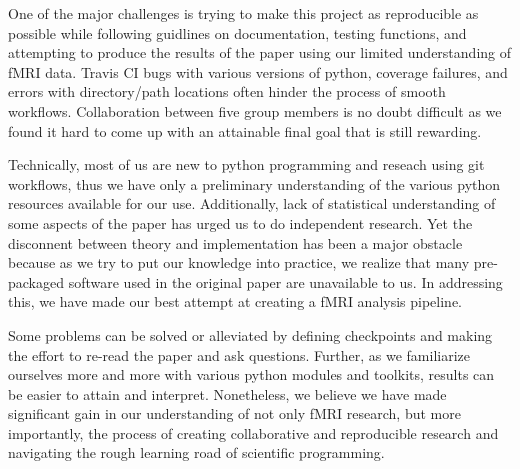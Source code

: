 \documentclass[11pt]{article}
\begin{document}
\par \indent One of the major challenges is trying to make this project as 
reproducible as possible while following guidlines on documentation, testing 
functions, and attempting to produce the results of the paper using our limited
understanding of fMRI data. Travis CI bugs with various versions of python, 
coverage failures, and errors with directory/path locations often hinder the 
process of smooth workflows. Collaboration between five group members is no 
doubt difficult as we found it hard to come up with an attainable final goal 
that is still rewarding. 
\par Technically, most of us are new to python programming and reseach using 
git workflows, thus we have only a preliminary understanding of the various 
python resources available for our use. Additionally, lack of statistical 
understanding of some aspects of the paper has urged us to do independent 
research. Yet the disconnent between theory and implementation has been a major 
obstacle because as we try to put our knowledge into practice, we realize that
many pre-packaged software used in the original paper are unavailable to us. 
In addressing this, we have made our best attempt at creating a fMRI analysis 
pipeline. 
\par Some problems can be solved or alleviated by defining checkpoints and making
the effort to re-read the paper and ask questions. Further, as we familiarize 
ourselves more and more  with various python modules and toolkits, results can 
be easier to attain and interpret. Nonetheless, we believe we have made 
significant gain in our understanding of not only fMRI research, but more 
importantly, the process of creating collaborative and reproducible research and
navigating the rough learning road of scientific programming. 



\end{document}
